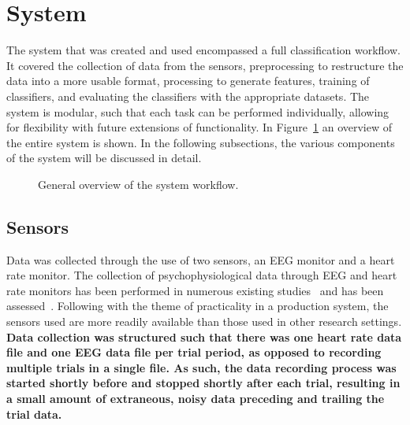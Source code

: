 \documentclass[11pt]{article}
\begin{document}
\section{System}
The system that was created and used encompassed a full classification workflow. It covered the collection of data from the sensors, preprocessing to restructure the data into a more usable format, processing to generate features, training of classifiers, and evaluating the classifiers with the appropriate datasets. The system is modular, such that each task can be performed individually, allowing for flexibility with future extensions of functionality. 
In Figure~\ref{fig:system-overview} an overview of the entire system is shown. In the following subsections, the various components of the system will be discussed in detail. 
\begin{figure}
\centering

\caption{General overview of the system workflow.}
\label{fig:system-overview}
\end{figure} 

	\subsection{Sensors}
	Data was collected through the use of two sensors, an EEG monitor and a heart rate monitor. The collection of psychophysiological data through EEG and heart rate monitors has been performed in numerous existing studies~\cite{...} and has been assessed~\cite{}. Following with the theme of practicality in a production system, the sensors used are more readily available than those used in other research settings. {\bf Data collection was structured such that there was one heart rate data file and one EEG data file per trial period, as opposed to recording multiple trials in a single file. As such, the data recording process was started shortly before and stopped shortly after each trial, resulting in a small amount of extraneous, noisy data preceding and trailing the trial data. \bf}
		
\end{document}
